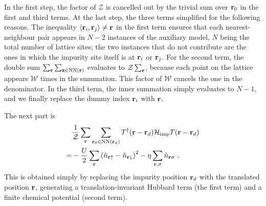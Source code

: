 \documentclass[reprint,hidelinks]{revtex4-2}
\begin{document}
In the first step, the factor of \(\mathcal{Z}\) is cancelled out by the trivial sum over \({\bf r}_0\) in the first and third terms. At the last step, the three terms simplified for the following reasons. The inequality \(\left<{\bf r}_i, {\bf r}_j\right>\neq{\bf r}\) in the first term ensures that each nearest-neighbour pair appears in \(N-2\) instances of the auxiliary model, \(N\) being the total number of lattice sites; the two instances that do not contribute are the ones in which the impurity site itself is at \({\bf r}_i\) or \({\bf r}_j\). For the second term, the double sum \(\sum_{\bf r}\sum_{{\bf z} \in \text{NN}({\bf r})}\) evaluates to \(\mathcal{Z}\sum_{\bf r}\), because each point on the lattice appears \(\mathcal{W}\) times in the summation. This factor of \(\mathcal{W}\) cancels the one in the denominator. In the third term, the inner summation simply evaluates to \(N-1\), and we finally replace the dummy index \({\bf r}_i\) with \({\bf r}\). 

The next part is
\begin{equation}\begin{aligned}
	&\frac{1}{\mathcal{Z}}\sum_{{\bf r}}\sum_{{\bf r}_0\in\text{NN}({\bf r}_d)}T^\dagger({\bf r} - {\bf r}_d)\mathcal{H}_\text{imp}T({\bf r} - {\bf r}_d) \\
	=& -\frac{U}{2}\sum_{{\bf r}}\left(\hat n_{{\bf r} \uparrow} - \hat n_{{\bf r} \downarrow} \right)^2 - \eta\sum_{{\bf r},\sigma} \hat n_{{\bf r}\sigma}~.
\end{aligned}\end{equation}
This is obtained simply by replacing the impurity position \({\bf r}_d\) with the translated position \({\bf r}\), generating a translation-invariant Hubbard term (the first term) and a finite chemical potential (second term).
\end{document}
